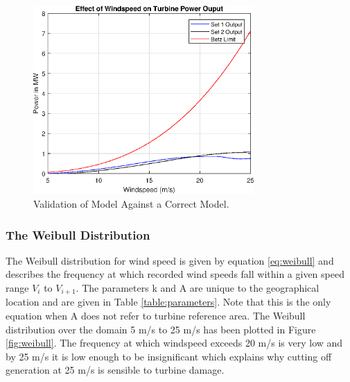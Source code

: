 \documentclass[11pt]{article}
\begin{document}
\begin{figure}[ht]
\centering
	\includegraphics[width=0.75\textwidth]{WindSpeedVPower}
	\caption{Validation of Model Against a Correct Model.}\label{fig:windspeedvpower}
\end{figure}
\FloatBarrier

\subsubsection{The Weibull Distribution}

The Weibull distribution for wind speed is given by equation \ref{eq:weibull} and describes the frequency at which recorded wind speeds fall within a given speed range $V_i$ to $V_{i+1}$. The parameters k and A are unique to the geographical location and are given in Table \ref{table:parameters}. Note that this is the only equation when A does not refer to turbine reference area. The Weibull distribution over the domain 5 m/s to 25 m/s has been plotted in Figure \ref{fig:weibull}. The frequency at which windspeed exceeds 20 m/s is very low and by 25 m/s it is low enough to be insignificant which explains why cutting off generation at 25 m/s is sensible to turbine damage.
\end{document}
